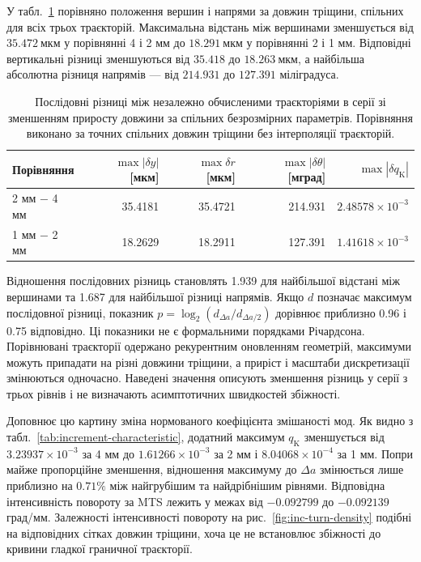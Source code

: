 \documentclass[a4paper,12pt]{article}
\begin{document}
У табл.~\ref{tab:increment-pairwise} порівняно положення вершин і напрями за довжин тріщини, спільних для всіх трьох
траєкторій. Максимальна відстань між вершинами зменшується від $35.472~\text{мкм}$ у порівнянні 4 і 2 мм до $18.291~\text{мкм}$
у порівнянні 2 і 1 мм. Відповідні вертикальні різниці зменшуються від $35.418$ до $18.263~\text{мкм}$, а
найбільша абсолютна різниця напрямів — від $214.931$ до $127.391$ міліградуса.

\begin{table}[htbp]
\centering
\small
\setlength{\tabcolsep}{4.0pt}
\caption{Послідовні різниці між незалежно обчисленими траєкторіями в серії зі зменшенням приросту довжини
за спільних безрозмірних параметрів. Порівняння виконано за точних спільних довжин тріщини без
інтерполяції траєкторій.}
\label{tab:increment-pairwise}
\begin{tabular}{lrrrr}
\toprule
Порівняння & $\max|\delta y|$ [мкм] & $\max\delta r$ [мкм] & $\max|\delta\theta|$ [мград] & $\max|\delta q_{\mathrm{K}}|$\\
\midrule
2 мм $-$ 4 мм & 35.4181 & 35.4721 & 214.931 & $2.48578\times10^{-3}$\\
1 мм $-$ 2 мм & 18.2629 & 18.2911 & 127.391 & $1.41618\times10^{-3}$\\
\bottomrule
\end{tabular}
\end{table}

Відношення послідовних різниць становлять 1.939 для найбільшої відстані між вершинами та 1.687 для
найбільшої різниці напрямів. Якщо $d$ позначає максимум послідовної різниці, показник $p=\log_2(d_{\Delta a}/d_{\Delta a/2})$ дорівнює
приблизно 0.96 і 0.75 відповідно. Ці показники не є формальними порядками Річардсона. Порівнювані
траєкторії одержано рекурентним оновленням геометрій, максимуми можуть припадати на різні
довжини тріщини, а приріст і масштаби дискретизації змінюються одночасно. Наведені значення
описують зменшення різниць у серії з трьох рівнів і не визначають асимптотичних швидкостей
збіжності.

Доповнює цю картину зміна нормованого коефіцієнта змішаності мод. Як видно з табл.~\ref{tab:increment-characteristic}, додатний
максимум $q_{\mathrm{K}}$ зменшується від $3.23937\times10^{-3}$ за 4 мм до $1.61266\times10^{-3}$ за 2 мм і $8.04068\times10^{-4}$ за 1 мм. Попри майже пропорційне
зменшення, відношення максимуму до $\Delta a$ змінюється лише приблизно на $0.71\%$ між найгрубішим та
найдрібнішим рівнями. Відповідна інтенсивність повороту за MTS лежить у межах від $-0.092799$ до $-0.092139$
град/мм. Залежності інтенсивності повороту на рис.~\ref{fig:inc-turn-density} подібні на відповідних сітках довжин
тріщини, хоча це не встановлює збіжності до кривини гладкої граничної траєкторії.
\end{document}
